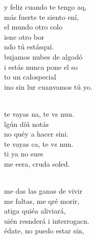\begin{cancion}%
	y feliz cuando te tengo aq,\\
	 más fuerte te siento ení,\\
	el mundo  otro colo\\
	iene otro bor \\
	ndo tú estásquí.\\
\jump
	bujamos nubes de algodó\\
	i estás nunca pone el so\\
	to un calospecial \\
	ino sin lur cuanvamos tú yo.\\\jump\\
	\begin{chorus}%
	 te vayas na, te vs nun.\\
	lgún díú notás\\
	no  quéy a hacer sini. \\
	 te vayas ca, te vs nun.\\
	ti ya no  sues\\
	me eera, cruda soled.\\
	\end{chorus}%
	\jump\\
	 me das las ganas de vivir\\
	me faltas, me qré morir,\\
	atiga quiéa aliviará,\\
	uién resnderá i interrogacn. \\
\jump
	édate, no puedo estar sin,\\

\end{cancion}
